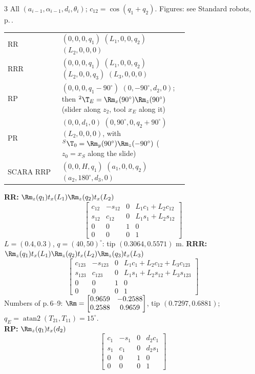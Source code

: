 \begin{multicols}{3}
All $(a_{i-1},\alpha_{i-1},d_i,\theta_i)$; $c_{12}=\cos(q_1{+}q_2)$. Figures: see Standard robots, p.\,\pageref{p:ROBOTS}.
\begin{center}\renewcommand{\arraystretch}{1.05}\footnotesize\begin{tabular}{@{}l@{\ }p{0.7\linewidth}@{}}
RR&$(0,0,0,q_1)$ $(L_1,0,0,q_2)$ $(L_2,0,0,0)$\\
RRR&$(0,0,0,q_1)$ $(L_1,0,0,q_2)$ $(L_2,0,0,q_3)$ $(L_3,0,0,0)$\\
RP&$(0,0,0,q_1{-}90^\circ)$ $(0,{-}90^\circ,d_2,0)$; then ${}^2\T_E=\Rm_x(90^\circ)\Rm_z(90^\circ)$ (slider along $z_2$, tool $x_E$ along it)\\
PR&$(0,0,d_1,0)$ $(0,90^\circ,0,q_2{+}90^\circ)$ $(L_2,0,0,0)$, with ${}^S\T_0=\Rm_y(90^\circ)\Rm_z(-90^\circ)$ ($z_0=x_S$ along the slide)\\
SCARA RRP&$(0,0,H,q_1)$ $(a_1,0,0,q_2)$ $(a_2,180^\circ,d_3,0)$\\
\end{tabular}\end{center}
\begin{fbx}
\textbf{RR:} $\Rm_z(q_1)t_x(L_1)\Rm_z(q_2)t_x(L_2)$
\[\begin{bmatrix}c_{12}&-s_{12}&0&L_1c_1+L_2c_{12}\\s_{12}&c_{12}&0&L_1s_1+L_2s_{12}\\0&0&1&0\\0&0&0&1\end{bmatrix}\]
$L{=}(0.4,0.3)$, $q{=}(40,50)^\circ$: tip $(0.3064,0.5571)$ m.
\textbf{RRR:} $\Rm_z(q_1)t_x(L_1)\Rm_z(q_2)t_x(L_2)\Rm_z(q_3)t_x(L_3)$
{\footnotesize\[\begin{bmatrix}c_{123}&-s_{123}&0&L_1c_1+L_2c_{12}+L_3c_{123}\\s_{123}&c_{123}&0&L_1s_1+L_2s_{12}+L_3s_{123}\\0&0&1&0\\0&0&0&1\end{bmatrix}\]}
Numbers of p.\,6--9: $\Rm=\begin{bmatrix}0.9659&-0.2588\\0.2588&0.9659\end{bmatrix}$, tip $(0.7297,0.6881)$; $q_E=\operatorname{atan2}(T_{21},T_{11})=15^\circ$.\\
\textbf{RP:} $\Rm_z(q_1)t_x(d_2)$
\[\begin{bmatrix}c_1&-s_1&0&d_2c_1\\s_1&c_1&0&d_2s_1\\0&0&1&0\\0&0&0&1\end{bmatrix}\]

\end{fbx}
\end{multicols}
